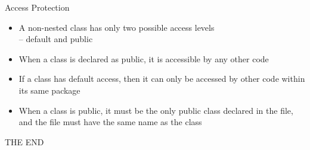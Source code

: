 \documentclass{beamer}
\begin{document}
\begin{frame}{Access Protection}
\begin{itemize}
\item A non-nested class has only two possible access
levels\\
– default and public

\item When a class is declared as public, it is accessible by
any other code
\item If a class has default access, then it can only be
accessed by other code within its same package
\item When a class is public, it must be the only public
class declared in the file, and the file must have the
same name as the class
\end{itemize}
\end{frame}



\begin{frame}
\Huge{\centerline{THE END }}
\end{frame}

\end{document}
